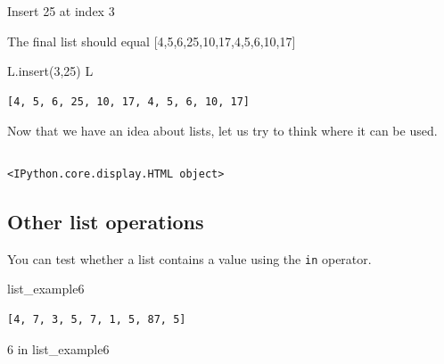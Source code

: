 \documentclass[
  letterpaper,
  DIV=11,
  numbers=noendperiod]{scrreprt}
\newenvironment{Shaded}{\begin{snugshade}}{\end{snugshade}}
\newcommand{\DecValTok}[1]{\textcolor[rgb]{0.68,0.00,0.00}{#1}}
\newcommand{\KeywordTok}[1]{\textcolor[rgb]{0.00,0.23,0.31}{#1}}
\newcommand{\NormalTok}[1]{\textcolor[rgb]{0.00,0.23,0.31}{#1}}
\begin{document}
\hypertarget{section-9}{%
\subsubsection{}\label{section-9}}

Insert 25 at index 3

The final list should equal {[}4,5,6,25,10,17,4,5,6,10,17{]}

\begin{Shaded}
\begin{Highlighting}[]
\NormalTok{L.insert(}\DecValTok{3}\NormalTok{,}\DecValTok{25}\NormalTok{)}
\NormalTok{L}
\end{Highlighting}
\end{Shaded}

\begin{verbatim}
[4, 5, 6, 25, 10, 17, 4, 5, 6, 10, 17]
\end{verbatim}

Now that we have an idea about lists, let us try to think where it can
be used.

\begin{verbatim}
\end{verbatim}

\begin{verbatim}
<IPython.core.display.HTML object>
\end{verbatim}

\hypertarget{other-list-operations}{%
\subsection{Other list operations}\label{other-list-operations}}

You can test whether a list contains a value using the \texttt{in}
operator.

\begin{Shaded}
\begin{Highlighting}[]
\NormalTok{list\_example6}
\end{Highlighting}
\end{Shaded}

\begin{verbatim}
[4, 7, 3, 5, 7, 1, 5, 87, 5]
\end{verbatim}

\begin{Shaded}
\begin{Highlighting}[]
\DecValTok{6} \KeywordTok{in}\NormalTok{ list\_example6}
\end{Highlighting}
\end{Shaded}
\end{document}
